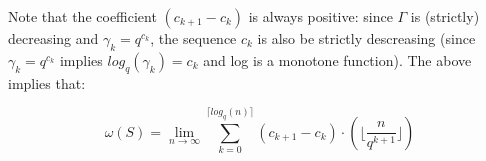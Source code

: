 Note that the coefficient $ (c_{k+1} - c_k)$  is always positive: since $\Gamma$ is (strictly) decreasing and $\gamma_k=q^{c_k}$, the sequence $c_k$ is  also be strictly descreasing (since $\gamma_k=q^{c_k}$ implies $log_q(\gamma_k)=c_k$ and log is a monotone function). The above implies that:

\[\omega(S) = \lim_{n\to\infty} \sum_{k=0}^{\lceil log_q(n) \rceil} (c_{k+1} - c_k) \cdot(\lfloor\frac{n}{q^{k+1}}\rfloor)\]











